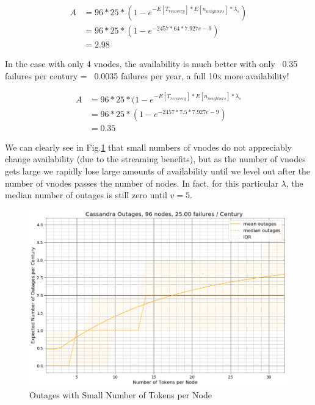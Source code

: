 \documentclass{article}
\begin{document}
\begin{equation}
    \begin{split}
    A & = 96 * 25 * (1 - e^{-E[T_{recovery}] * E[n_{neighbors}] * \lambda_{s}}) \\
    & = 96 * 25 * (1 - e^{-2457 * 64 * 7.927e-9}) \\
    & = 2.98
    \end{split}
\end{equation}

In the case with only 4 vnodes, the availability is much better with
only ~0.35 failures per century = ~0.0035 failures per year, a full 10x more
availability!

\begin{equation}
    \begin{split}
    A & = 96 * 25 * (1 - e^{-E[T_{recovery}] * E[n_{neighbors}] * \lambda_{s}} \\
    & = 96 * 25 * (1 - e^{-2457 * 7.5 * 7.927e-9}) \\
    & = 0.35
    \end{split}
\end{equation}


We can clearly see in Fig.\ref{fig:outages_small_vnodes} that small numbers of
vnodes do not appreciably change availability (due to the streaming benefits),
but as the number of vnodes gets large we rapidly lose large amounts of
availability until we level out after the number of vnodes passes the number of
nodes. In fact, for this particular $\lambda$, the median number of outages is
still zero until $v=5$.

\begin{figure}[h!]
    \centering
    \includegraphics[width=1.0\textwidth]{images/outages_vnodes_small.png}
    \caption{Outages with Small Number of Tokens per Node}
    \label{fig:outages_small_vnodes}
\end{figure}
\end{document}
